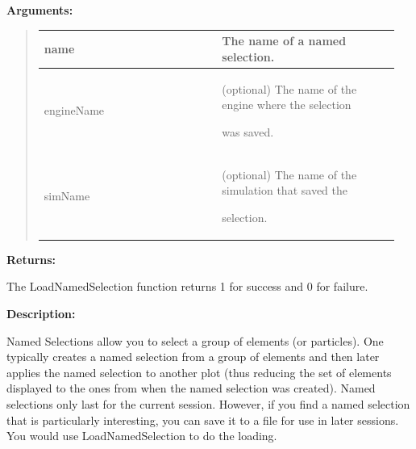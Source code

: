 \documentclass[letterpaper,10pt,english]{sphinxmanual}
\begin{document}
\begin{DUlineblock}{0em}
\item[] 
\item[] \textbf{Arguments:}
\end{DUlineblock}
\begin{quote}

\begin{tabular}{|p{0.475\linewidth}|p{0.475\linewidth}|}
\hline

name
 & 
The name of a named selection.
\\
\hline
engineName
 & 
\begin{DUlineblock}{0em}
\item[] (optional) The name of the engine where the selection
\item[] was saved.
\end{DUlineblock}
\\
\hline
simName
 & 
\begin{DUlineblock}{0em}
\item[] (optional) The name of the simulation that saved the
\item[] selection.
\end{DUlineblock}
\\
\hline\end{tabular}

\end{quote}

\begin{DUlineblock}{0em}
\item[] 
\item[] \textbf{Returns:}
\item[] The LoadNamedSelection function returns 1 for success and 0 for failure.
\item[] 
\item[] \textbf{Description:}
\item[] Named Selections allow you to select a group of elements (or particles).
One typically creates a named selection from a group of elements and then
later applies the named selection to another plot (thus reducing the
set of elements displayed to the ones from when the named selection was
created).  Named selections only last for the current session.  However,
if you find a named selection that is particularly interesting, you can
save it to a file for use in later sessions.  You would use
LoadNamedSelection to do the loading.
\end{DUlineblock}

\begin{DUlineblock}{0em}
\item[] 
\end{DUlineblock}
\end{document}
